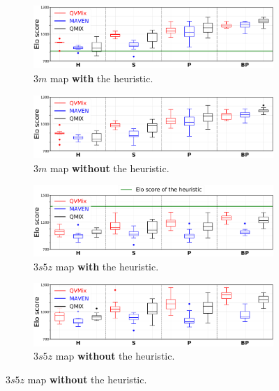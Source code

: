 \begin{figure}[ht]
\begin{subfigure}{\textwidth}
\centering
\includegraphics[width=.9\textwidth]{tex_thesis/figures/ch7/3m_tiny_all_h_clean.pdf}
\caption{$3m$ map \textbf{with} the heuristic.}
\label{subfig:3m_all_h}
\end{subfigure}
\begin{subfigure}{\textwidth}
\centering
\includegraphics[width=.9\textwidth]{tex_thesis/figures/ch7/3m_tiny_all_no_h_clean.pdf}
\caption{$3m$ map \textbf{without} the heuristic.}
\label{subfig:3m_all_no_h}
\end{subfigure}
\begin{subfigure}{\textwidth}
\centering
\includegraphics[width=.9\textwidth]{tex_thesis/figures/ch7/3s5z_tiny_all_h_clean.pdf}
\caption{$3s5z$ map \textbf{with} the heuristic.}
\label{subfig:3s5z_all_h}
\end{subfigure}
\begin{subfigure}{\textwidth}
\centering
\includegraphics[width=.9\textwidth]{tex_thesis/figures/ch7/3s5z_tiny_all_no_h_clean.pdf}
\caption{$3s5z$ map \textbf{without} the heuristic.}

\end{subfigure}
\end{figure}
